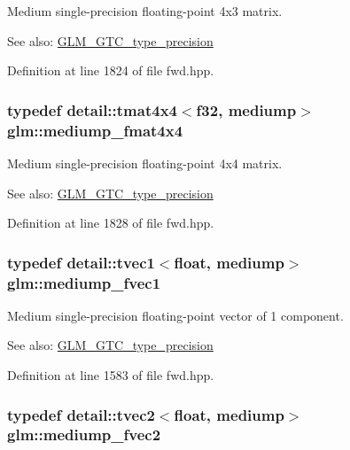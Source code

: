 Medium single-precision floating-point 4x3 matrix. \begin{Desc}
\item[See also:]\hyperlink{group__gtc__type__precision}{GLM\_\-GTC\_\-type\_\-precision} \end{Desc}


Definition at line 1824 of file fwd.hpp.\hypertarget{group__gtc__type__precision_g7f4ae9d05ca94005a0b7d8e3c59943cd}{
\subsubsection[mediump\_\-fmat4x4]{\setlength{\rightskip}{0pt plus 5cm}typedef detail::tmat4x4$<$f32, mediump$>$ {\bf glm::mediump\_\-fmat4x4}}}
\label{group__gtc__type__precision_g7f4ae9d05ca94005a0b7d8e3c59943cd}


Medium single-precision floating-point 4x4 matrix. \begin{Desc}
\item[See also:]\hyperlink{group__gtc__type__precision}{GLM\_\-GTC\_\-type\_\-precision} \end{Desc}


Definition at line 1828 of file fwd.hpp.\hypertarget{group__gtc__type__precision_g4534af301d5260974cee29f76842d579}{
\subsubsection[mediump\_\-fvec1]{\setlength{\rightskip}{0pt plus 5cm}typedef detail::tvec1$<$float, mediump$>$ {\bf glm::mediump\_\-fvec1}}}
\label{group__gtc__type__precision_g4534af301d5260974cee29f76842d579}


Medium single-precision floating-point vector of 1 component. \begin{Desc}
\item[See also:]\hyperlink{group__gtc__type__precision}{GLM\_\-GTC\_\-type\_\-precision} \end{Desc}


Definition at line 1583 of file fwd.hpp.\hypertarget{group__gtc__type__precision_g5c2686caa6838515f6727eea1b64aa05}{
\subsubsection[mediump\_\-fvec2]{\setlength{\rightskip}{0pt plus 5cm}typedef detail::tvec2$<$float, mediump$>$ {\bf glm::mediump\_\-fvec2}}}
\label{group__gtc__type__precision_g5c2686caa6838515f6727eea1b64aa05}


